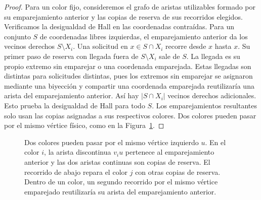 \begin{proof}
Para un color fijo, consideremos el grafo de aristas utilizables formado por su emparejamiento anterior y las copias de reserva de sus recorridos elegidos. Verificamos la desigualdad de Hall en las coordenadas contraídas. Para un conjunto \(S\) de coordenadas libres izquierdas, el emparejamiento anterior da los vecinos derechos \(S\setminus X_i\). Una solicitud en \(x\in S\cap X_i\) recorre desde \(x\) hasta \(x\). Su primer paso de reserva con llegada fuera de \(S\setminus X_i\) sale de \(S\). La llegada es su propio extremo sin emparejar o una coordenada emparejada. Estas llegadas son distintas para solicitudes distintas, pues los extremos sin emparejar se asignaron mediante una biyección y compartir una coordenada emparejada reutilizaría una arista del emparejamiento anterior. Así hay \(|S\cap X_i|\) vecinos derechos adicionales. Esto prueba la desigualdad de Hall para todo \(S\). Los emparejamientos resultantes solo usan las copias asignadas a sus respectivos colores. Dos colores pueden pasar por el mismo vértice físico, como en la Figura~\ref{fig:repair}.
\end{proof}

\begin{figure}[htbp]
\centering
{}
\caption{Dos colores pueden pasar por el mismo vértice izquierdo \(u\). En el color \(i\), la arista discontinua \(v_i u\) pertenece al emparejamiento anterior y las dos aristas continuas son copias de reserva. El recorrido de abajo repara el color \(j\) con otras copias de reserva. Dentro de un color, un segundo recorrido por el mismo vértice emparejado reutilizaría su arista del emparejamiento anterior.}\label{fig:repair}
\end{figure}

